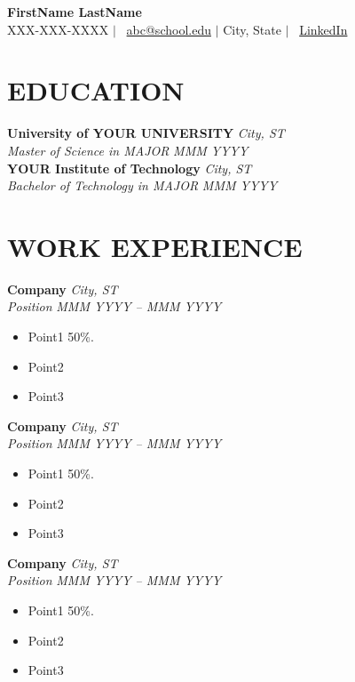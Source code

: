 \documentclass[a4paper,11pt]{article}
\begin{document}
\pagestyle{empty}

\begin{center}
  \textbf{\LARGE FirstName LastName} \\
  XXX-XXX-XXXX $|$ \faEnvelopeO\ \href{mailto:insertemail}{abc@school.edu} $|$ City, State $|$ \faLinkedin\ \href{https://www.linkedin.com/in/}{LinkedIn}
\end{center}

\section*{EDUCATION}
\textbf{University of YOUR UNIVERSITY} \hfill \textit{City, ST} \\
\textit{Master of Science in MAJOR} \hfill \textit{MMM YYYY} \\
\textbf{YOUR Institute of Technology} \hfill \textit{City, ST} \\
\textit{Bachelor of Technology in MAJOR} \hfill \textit{MMM YYYY}

\section*{WORK EXPERIENCE}
\textbf{Company} \hfill \textit{City, ST} \\
\textit{Position} \hfill \textit{MMM YYYY – MMM YYYY}
\vspace{-0.2cm}
\begin{itemize}[noitemsep]
  \item Point1 50\%.
  \item Point2
  \item Point3
\end{itemize}
\textbf{Company} \hfill \textit{City, ST} \\
\textit{Position} \hfill \textit{MMM YYYY – MMM YYYY}
\vspace{-0.2cm}
\begin{itemize}[noitemsep]
  \item Point1 50\%.
  \item Point2
  \item Point3
\end{itemize}
\textbf{Company} \hfill \textit{City, ST} \\
\textit{Position} \hfill \textit{MMM YYYY – MMM YYYY}
\vspace{-0.2cm}
\begin{itemize}[noitemsep]
  \item Point1 50\%.
  \item Point2
  \item Point3
\end{itemize}
\end{document}
